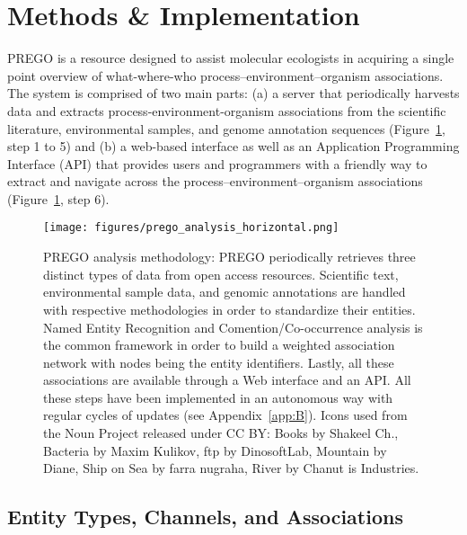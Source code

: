 \section{Methods \& Implementation}
\label{sec:prego-methods}

   PREGO is a resource designed to assist molecular ecologists in acquiring a single point overview of what-where-who process–environment–organism associations. The system is comprised of two main parts: (a) a server that periodically harvests data and extracts process-environment-organism associations from the scientific literature, environmental samples, and genome annotation sequences (Figure~\ref{fig:prego-pipeline}, step 1 to 5) and (b) a web-based interface as well as an Application Programming Interface (API) that provides users and programmers with a friendly way to extract and navigate across the process–environment–organism associations (Figure~\ref{fig:prego-pipeline}, step 6).

   \begin{figure}[h]
      \centering
      \texttt{[image: figures/prego\_analysis\_horizontal.png]}
      \caption[PREGO analysis methodology]{
         PREGO analysis methodology: PREGO periodically retrieves three distinct types of data from open access resources. 
         Scientific text, environmental sample data, and genomic annotations are handled with respective methodologies in order to standardize their entities. 
         Named Entity Recognition and Comention/Co-occurrence analysis is the common framework in order to build a weighted association network with nodes being the entity identifiers. Lastly, all these associations are available through a Web interface and an API. 
         All these steps have been implemented in an autonomous way with regular cycles of updates (see Appendix~\ref{app:B}). 
         Icons used from the Noun Project released under CC BY: Books by Shakeel Ch., Bacteria by Maxim Kulikov, ftp by DinosoftLab, Mountain by Diane, Ship on Sea by farra nugraha, River by Chanut is Industries.
      }
      \label{fig:prego-pipeline}
   \end{figure}



   \subsection{Entity Types, Channels, and Associations}
   \label{subsec:prego-terms}

